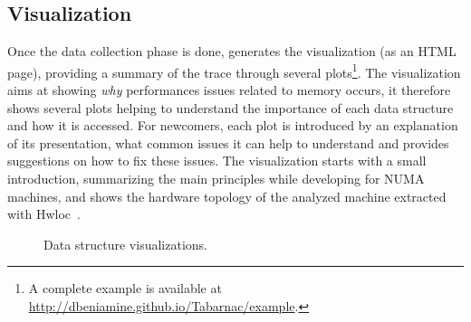 



\subsection{Visualization}
\label{sec:design-visu}


Once the data collection phase is done,
\TABARNAC generates the visualization (as an HTML page), providing a summary
of the trace through several plots\footnote{A complete example is available at\\
    \url{http://dbeniamine.github.io/Tabarnac/example}.}.
The visualization aims at showing \emph{why} performances issues related
to memory occurs, it therefore shows several plots helping to understand the
importance of each data structure and how it is accessed.
For newcomers, each plot is introduced by an explanation
of its presentation, what common issues it can help to understand and provides
suggestions on how to fix these issues.  The visualization starts with a small
introduction, summarizing the main principles while developing for NUMA
machines, and shows the hardware topology of the analyzed machine extracted
with Hwloc~\cite{Broquedis10hwloc}.

\begin{figure}[!htb]
    \centering
    \caption{Data structure visualizations.}
    \label{fig:example_plot1}
\end{figure}


